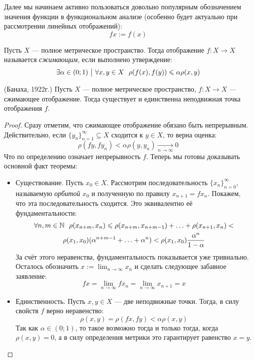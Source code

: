 \begin{designation}
	Далее мы начинаем активно пользоваться довольно популярным обозначением значения функции в функциональном анализе (особенно будет актуально при рассмотрении линейных отображений):
	\[
		fx := f(x)
	\]
\end{designation}

\begin{definition}
	Пусть $X$ --- полное метрическое пространство. Тогда отображение $f \colon X \to X$ называется \textit{сжимающим}, если выполнено утверждение:
	\[
		\exists \alpha \in (0; 1) \ \big|\  \forall x, y \in X\ \ \rho(f(x), f(y)) \leqslant \alpha\rho(x, y)
	\]
\end{definition}

\begin{theorem} (Банаха, 1922г.)
	Пусть $X$ --- полное метрическое пространство, $f \colon X \to X$ --- сжимающее отображение. Тогда существует и единственна неподвижная точка отображения $f$.
\end{theorem}

\begin{proof}
	Сразу отметим, что сжимающее отображение обязано быть непрерывным. Действительно, если $\{y_n\}_{n = 1}^\infty \subseteq X$ сходится к $y \in X$, то верна оценка:
	\[
		\rho(fy, fy_n) < \alpha\rho(y, y_n) \xrightarrow[n \to \infty]{} 0
	\]
	Что по определению означает непрерывность $f$. Теперь мы готовы доказывать основной факт теоремы:
	\begin{itemize}
		\item Существование. Пусть $x_0 \in X$. Рассмотрим последовательность $\{x_n\}_{n = 0}^\infty$, называемую \textit{орбитой} $x_0$ и полученную по правилу $x_{n + 1} = fx_n$. Покажем, что эта последовательность сходится. Это эквивалентно её фундаментальности:
		\begin{multline*}
			\forall n, m \in \mathbb{N}\ \ \rho(x_{n + m}, x_n) \leqslant \rho(x_{n + m}, x_{n + m - 1}) + \ldots + \rho(x_{n + 1}, x_n) <
			\\
			\rho(x_1, x_0)(\alpha^{n + m - 1} + \ldots + \alpha^n) < \rho(x_1, x_0) \frac{\alpha^n}{1 - \alpha}
		\end{multline*}
		За счёт этого неравенства, фундаментальность показывается уже тривиально. Осталось обозначить $x := \lim_{n \to \infty} x_n$ и сделать следующее забавное заявление:
		\[
			fx = \lim_{n \to \infty} fx_n = \lim_{n \to \infty} x_{n + 1} = x
		\]
		
		\item Единственность. Пусть $x, y \in X$ --- две неподвижные точки. Тогда, в силу свойств $f$ верно неравенство:
		\[
			\rho(x, y) = \rho(fx, fy) < \alpha\rho(x, y)
		\]
		Так как $\alpha \in (0; 1)$, то такое возможно тогда и только тогда, когда $\rho(x, y) = 0$, а в силу определения метрики это гарантирует равенство $x = y$.
	\end{itemize}
\end{proof}


